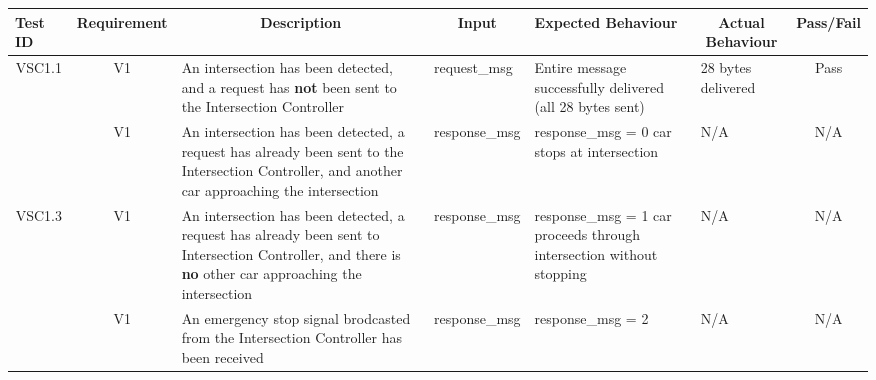 \documentclass [10pt]{article}
\begin{document}
    
 \begin{longtable}{ | p{ } | p{ } |  p{ } |  p{ } | p{ } | p{ } |  p{ } |}  \hline

    \rowcolor{subsectionC}\textbf{Test ID}  
    & \textbf{Requirement}
    & \multicolumn{1}{c|}{\textbf{Description} }
    & \multicolumn{1}{c|}{\textbf{Input} }
    & \textbf{Expected Behaviour} 
    & \multicolumn{1}{c|}{\textbf{Actual Behaviour} }
    & \textbf{Pass/Fail} \\  \hline
    
    
    
    
    \multicolumn{1}{|c|}{VSC1.1} 
    & \multicolumn{1}{c|}{V1}
    & An intersection has been detected, and a request has \textbf{not} been sent to the Intersection Controller \newline
    & request\_msg
    & Entire message successfully delivered (all 28 bytes sent)
    & 28 bytes delivered
    & \multicolumn{1}{c|}{Pass}\\  \hline
     
    \rowcolor{tableCell}\multicolumn{1}{|c|}{VSC1.2} 
    & \multicolumn{1}{c|}{V1}
     & An intersection has been detected, a request has already been sent to the Intersection Controller, and another car approaching the intersection
    & response\_msg
    & response\_msg = 0\newline
      car stops at intersection
    & N/A
    & \multicolumn{1}{c|}{N/A}\\  \hline
  
    
    \multicolumn{1}{|c|}{VSC1.3} 
    & \multicolumn{1}{c|}{V1}
    & An intersection has been detected, a request has already been sent to Intersection Controller, and there is \textbf{no} other car approaching the intersection
    & response\_msg
    & response\_msg = 1\newline
      car proceeds through intersection without stopping
    & N/A
    & \multicolumn{1}{c|}{N/A}\\  \hline
    
    \newpage \hline
    
    \rowcolor{tableCell}\multicolumn{1}{|c|}{VSC1.4} 
    & \multicolumn{1}{c|}{V1}
    & An emergency stop signal brodcasted from the Intersection Controller has been received
    & response\_msg
    & response\_msg = 2
    & N/A
    & \multicolumn{1}{c|}{N/A}\\  \hline
     
    \end{longtable}
\end{document}
